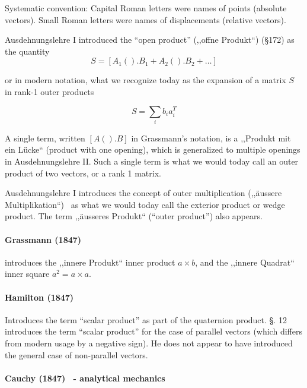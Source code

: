 Systematic convention: Capital Roman letters were names of points (absolute vectors). Small Roman letters were names of displacements (relative vectors).

Ausdehnungslehre I introduced the ``open product'' (,,offne Produkt``) (\S 172) as the quantity
\[
S = [A_1().B_1 + A_2().B_2 + \dots]
\]

or in modern notation, what we recognize today as the expansion of a matrix $S$ in rank-1 outer products

\[
S = \sum_i b_i a_i^T
\]

A single term, written $[A().B]$ in Grassmann's notation, is a ,,Produkt mit ein Lücke`` (product with one opening), which is generalized to multiple openings in Ausdehnungslehre II. Such a single term is what we would today call an outer product of two vectors, or a rank 1 matrix.

Ausdehnungslehre I introduces the concept of outer multiplication (,,äussere Multiplikation``)~\cite[\S 34, p.57]{Grassmann1844}\cite[p. 81]{Grassmann1995} as what we would today call the exterior product or wedge product. The term ,,äusseres Produkt``\cite[\S 36, p. 60]{Grassmann1844} (``outer product''\cite[p. 84]{Grassmann1995}) also appears.

\paragraph{Grassmann (1847)~\cite{Grassmann1847,Grassmann1995}}

\cite[p. 16]{Grassmann1847}\cite[\S 7, p. 334]{Grassmann1995} introduces the
 ,,innere Produkt`` inner product $a \times b$, and the
 ,,innere Quadrat`` inner square $a^2 = a \times a$.

\paragraph{Hamilton (1847)~\cite{Hamilton1847}}

Introduces the term ``scalar product'' as part of the quaternion product.
\S. 12 introduces the term ``scalar product'' for the case of parallel vectors (which differs from modern usage by a negative sign).
He does not appear to have introduced the general case of non-parallel vectors.

\paragraph{Cauchy (1847)~\cite{Cauchy1847} - analytical mechanics}

